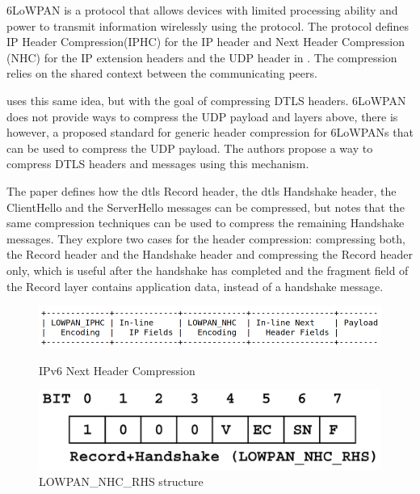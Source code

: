 \documentclass{llncs}
\begin{document}
6LoWPAN\cite{RFC4944} is a protocol that allows devices with limited processing
ability and power to transmit information wirelessly using the 
protocol. The protocol defines IP Header Compression(IPHC) for the IP header and
Next Header Compression (NHC) for the IP extension headers and the UDP header in \cite{RFC6282}.
The compression relies on the shared context between the communicating peers.

\cite{6LoWPANC53:online} uses this same idea, but with the goal of compressing DTLS headers.
6LoWPAN does not provide ways to compress the UDP payload and layers above, there
is however, a proposed standard\cite{RFC7400} for generic header compression
for 6LoWPANs that can be used to compress the UDP payload. The authors propose
a way to compress DTLS headers and messages using this mechanism.

The paper \cite{6LoWPANC53:online} defines how the \gls{dtls} Record header, the \gls{dtls} Handshake header,
the ClientHello and the ServerHello messages can be compressed, but notes that
the same compression techniques can be used to compress the remaining Handshake
messages. They explore two cases for the header compression: compressing both,
the Record header and the Handshake header and compressing the Record header only,
which is useful after the handshake has completed and the fragment field of the
Record layer contains application data, instead of a handshake message.

\begin{figure}
    \centering
    \begin{minipage}{0.5\textwidth}
        \centering
        \includegraphics[width=1.0\textwidth]{img/6lowpan-header.png} %
        \caption{\label{fig:6lowpan-header} IPv6 Next Header Compression}
    \end{minipage}\hfill
    \begin{minipage}{0.5\textwidth}
        \centering
        \includegraphics[width=1.0\textwidth]{img/6lowpan-ghc-rhs.png} %
        \caption{\label{fig:6lowpan-ghc-rhs} LOWPAN\_NHC\_RHS structure}
    \end{minipage}
\end{figure}
\end{document}
